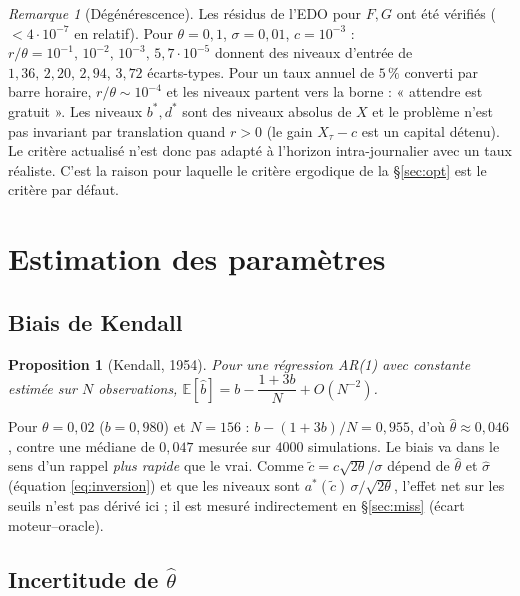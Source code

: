 \documentclass[11pt,a4paper]{article}
\newtheorem{proposition}{Proposition}
\theoremstyle{definition}
\theoremstyle{remark}
\newtheorem{remarque}{Remarque}
\newcommand{\E}{\mathbb{E}}
\begin{document}
\begin{remarque}[Dégénérescence]
Les résidus de l'EDO pour $F,G$ ont été vérifiés ($<4\cdot10^{-7}$ en relatif). Pour $\theta=0{,}1$, $\sigma=0{,}01$, $c=10^{-3}$ :
$r/\theta=10^{-1},\,10^{-2},\,10^{-3},\,5{,}7\cdot10^{-5}$ donnent des niveaux d'entrée de $1{,}36,\,2{,}20,\,2{,}94,\,3{,}72$ écarts-types.
Pour un taux annuel de $5\,\%$ converti par barre horaire, $r/\theta\sim10^{-4}$ et les niveaux partent vers la borne : « attendre est gratuit ».
Les niveaux $b^*,d^*$ sont des niveaux absolus de $X$ et le problème n'est pas invariant par translation quand $r>0$ (le gain $X_\tau-c$ est un capital détenu).
Le critère actualisé n'est donc pas adapté à l'horizon intra-journalier avec un taux réaliste. C'est la raison pour laquelle le critère ergodique de la \S\ref{sec:opt}
est le critère par défaut.
\end{remarque}

\section{Estimation des paramètres}

\subsection{Biais de Kendall}

\begin{proposition}[Kendall, 1954]
Pour une régression AR(1) avec constante estimée sur $N$ observations,
$\E[\hat b]=b-\dfrac{1+3b}{N}+O(N^{-2})$.
\end{proposition}

Pour $\theta=0{,}02$ ($b=0{,}980$) et $N=156$ : $b-(1+3b)/N=0{,}955$, d'où $\hat\theta\approx0{,}046$,
contre une médiane de $0{,}047$ mesurée sur $4000$ simulations. Le biais va dans le sens d'un rappel \emph{plus rapide}
que le vrai. Comme $\tilde c=c\sqrt{2\theta}/\sigma$ dépend de $\hat\theta$ et $\hat\sigma$ (équation \eqref{eq:inversion}) et que les niveaux sont
$a^*(\tilde c)\,\sigma/\sqrt{2\theta}$, l'effet net sur les seuils n'est pas dérivé ici ; il est mesuré indirectement en \S\ref{sec:miss} (écart moteur--oracle).

\subsection{Incertitude de $\hat\theta$}
\end{document}
